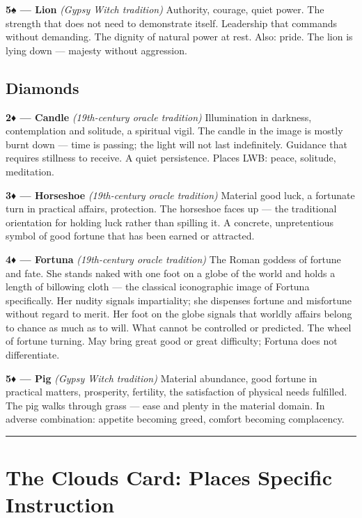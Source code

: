 \textbf{5♠ --- Lion} \emph{(Gypsy Witch tradition)} Authority, courage, quiet power. The strength that does not need to demonstrate itself. Leadership that commands without demanding. The dignity of natural power at rest. Also: pride. The lion is lying down --- majesty without aggression.

\subsection{Diamonds}\label{diamonds}

\textbf{2♦ --- Candle} \emph{(19th-century oracle tradition)} Illumination in darkness, contemplation and solitude, a spiritual vigil. The candle in the image is mostly burnt down --- time is passing; the light will not last indefinitely. Guidance that requires stillness to receive. A quiet persistence. Place\textquotesingle s LWB: peace, solitude, meditation.

\textbf{3♦ --- Horseshoe} \emph{(19th-century oracle tradition)} Material good luck, a fortunate turn in practical affairs, protection. The horseshoe faces up --- the traditional orientation for holding luck rather than spilling it. A concrete, unpretentious symbol of good fortune that has been earned or attracted.

\textbf{4♦ --- Fortuna} \emph{(19th-century oracle tradition)} The Roman goddess of fortune and fate. She stands naked with one foot on a globe of the world and holds a length of billowing cloth --- the classical iconographic image of Fortuna specifically. Her nudity signals impartiality; she dispenses fortune and misfortune without regard to merit. Her foot on the globe signals that worldly affairs belong to chance as much as to will. What cannot be controlled or predicted. The wheel of fortune turning. May bring great good or great difficulty; Fortuna does not differentiate.

\textbf{5♦ --- Pig} \emph{(Gypsy Witch tradition)} Material abundance, good fortune in practical matters, prosperity, fertility, the satisfaction of physical needs fulfilled. The pig walks through grass --- ease and plenty in the material domain. In adverse combination: appetite becoming greed, comfort becoming complacency.

\begin{center}\rule{0.5\linewidth}{0.5pt}\end{center}

\section{The Clouds Card: Place\textquotesingle s Specific Instruction}\label{the-clouds-card-places-specific-instruction}

